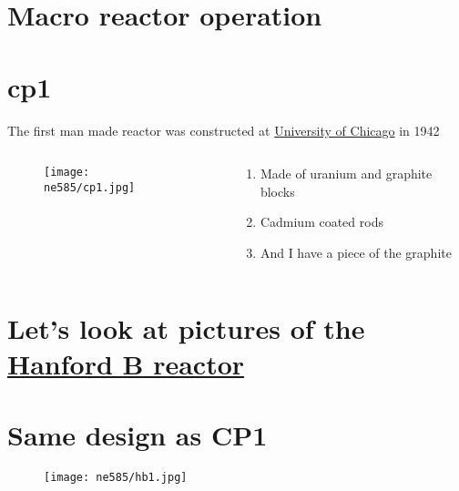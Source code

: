 \documentclass[aspectratio=1610,pdftex,dvipsnames,compress,xcolor={dvipsnames}]{beamer}
\newcommand{\acf}{\acrfull} %
\begin{document}
\section{Macro reactor operation}
\section{\acf{cp1}}


\addtocounter{framenumber}{-2} 
\begin{frame}{The first man made reactor was constructed at \href{https://uidaho.pressbooks.pub/nuclearengineering/chapter/front-end-of-the-fuel-cycle-2/}{University of Chicago} in 1942}
    \begin{columns}[c]

        \begin{column}{0.55\textwidth}
            \begin{figure}
                \centering
                \texttt{[image: ne585/cp1.jpg]}
            \end{figure}
        \end{column}

        \begin{column}{0.45\textwidth}
            \begin{enumerate}[series=outerlist,topsep=0pt,itemsep=21pt,leftmargin=*,label=(\arabic*)]
                \item[]Made of uranium and graphite blocks
                \item[]Cadmium coated rods
                \item[]And I have a piece of the graphite
            \end{enumerate}
        \end{column}

    \end{columns}
\end{frame}


\section{Let's look at pictures of the \href{https://uidaho.pressbooks.pub/nuclearengineering/chapter/front-end-of-the-fuel-cycle-2/}{Hanford B reactor}}
\section{Same design as CP1}


\addtocounter{framenumber}{-2} 
\begin{frame}{}
    \begin{figure}
        \centering
        \texttt{[image: ne585/hb1.jpg]}
    \end{figure}
\end{frame}
\end{document}
